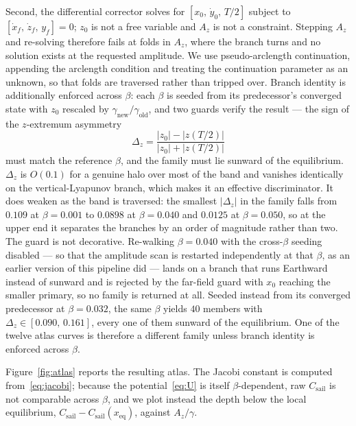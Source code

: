 \documentclass[pdflatex,sn-mathphys-num]{sn-jnl}
\begin{document}
Second, the differential corrector solves for $[x_0,\,\dot y_0,\,T/2]$ subject
to $[\dot x_f,\,\dot z_f,\,y_f]=0$; $z_0$ is not a free variable and $A_z$ is
not a constraint. Stepping $A_z$ and re-solving therefore fails at folds in
$A_z$, where the branch turns and no solution exists at the requested
amplitude. We use pseudo-arclength continuation, appending the arclength
condition and treating the continuation parameter as an unknown, so that folds
are traversed rather than tripped over. Branch identity is additionally
enforced across $\beta$: each $\beta$ is seeded from its predecessor's converged
state with $z_0$ rescaled by $\gamma_{\mathrm{new}}/\gamma_{\mathrm{old}}$, and
two guards verify the result --- the sign of the $z$-extremum asymmetry
\begin{equation}
  \Delta_z = \frac{\lvert z_0\rvert - \lvert z(T/2)\rvert}
                  {\lvert z_0\rvert + \lvert z(T/2)\rvert}
\end{equation}
must match the reference $\beta$, and the family must lie sunward of the
equilibrium. $\Delta_z$ is $O(0.1)$ for a genuine halo over most of the band and
vanishes identically on the vertical-Lyapunov branch, which makes it an
effective discriminator. It does weaken as the band is traversed: the smallest
$\lvert\Delta_z\rvert$ in the family falls from $0.109$ at $\beta=0.001$ to
$0.0898$ at $\beta=0.040$ and $0.0125$ at $\beta=0.050$, so at the upper end it
separates the branches by an order of magnitude rather than two.
The guard is not decorative. Re-walking $\beta=0.040$ with the cross-$\beta$
seeding disabled --- so that the amplitude scan is restarted independently at
that $\beta$, as an earlier version of this pipeline did --- lands on a branch
that runs Earthward instead of sunward and is rejected by the far-field guard
with $x_0$ reaching the smaller primary, so no family is returned at all.
Seeded instead from its converged predecessor at $\beta=0.032$, the same
$\beta$ yields $40$ members with $\Delta_z\in[0.090,\,0.161]$, every one of them
sunward of the equilibrium. One of the twelve atlas curves is therefore a
different family unless branch identity is enforced across $\beta$.

Figure~\ref{fig:atlas} reports the resulting atlas. The Jacobi constant is
computed from~\eqref{eq:jacobi}; because the potential~\eqref{eq:U} is itself
$\beta$-dependent, raw $C_{\mathrm{sail}}$ is not comparable across $\beta$, and
we plot instead the depth below the local equilibrium,
$C_{\mathrm{sail}}-C_{\mathrm{sail}}(x_{\mathrm{eq}})$, against $A_z/\gamma$.
\end{document}
